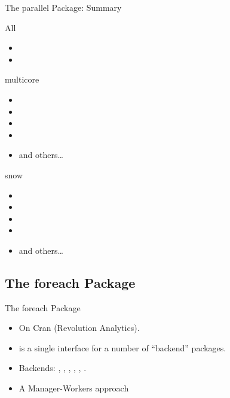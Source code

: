 \begin{frame}{The parallel Package: Summary}
  \begin{block}{All}
    \begin{itemize}
      \item {}
      \item {}
    \end{itemize}
  \end{block}
  \begin{minipage}[t]{.475\textwidth}
    \begin{block}{multicore}
      \begin{itemize}
        \item {}
        \item {}
        \item {}
        \item {}
        \item and others\dots
      \end{itemize}
    \end{block}
  \end{minipage}
  \hfill
  \begin{minipage}[t]{.475\textwidth}
    \begin{block}{snow}
      \begin{itemize}
        \item {}
        \item {}
        \item {}
        \item {}
        \item and others\dots
      \end{itemize}
    \end{block}
  \end{minipage}
\end{frame}


\subsection{The foreach Package}
\makesubcontentsslidessec

\begin{frame}
  \begin{block}{The foreach Package}
    \begin{itemize}
    \item On Cran (Revolution Analytics).
    \item {} is a single interface for a number of
      ``backend'' packages. 
    \item Backends:  , , , ,
      , .
    \item A Manager-Workers approach
    \end{itemize}
  \end{block}
\end{frame}


